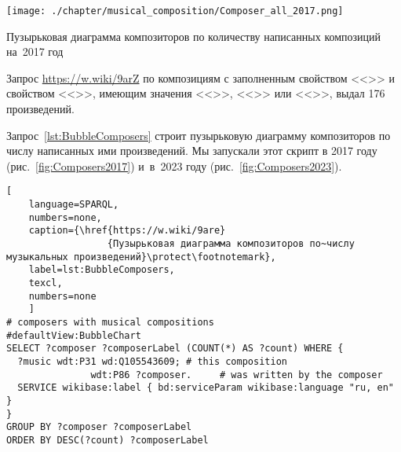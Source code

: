 \begin{marginfigure}[1\baselineskip]
  \texttt{[image: ./chapter/musical\_composition/Composer\_all\_2017.png]}
  \vspace{-7pt}
  \caption[Пузырьковая диаграмма композиторов по количеству написанных композиций на~2017 год]{Пузырьковая диаграмма композиторов по количеству написанных композиций на~2017 год}%
  \label{fig:Composers2017}%
\end{marginfigure}

Запрос \href{https://w.wiki/9arZ}{https://w.wiki/9arZ} по композициям с заполненным свойством <<>> и свойством <<>>, имеющим значения <<>>, <<>> или <<>>, выдал \num{176} произведений.


Запрос~\ref{lst:BubbleComposers} строит пузырьковую диаграмму композиторов по числу написанных ими произведений.
Мы запускали этот скрипт в 2017 году (рис.~\ref{fig:Composers2017}) 
и~в~2023 году (рис.~\ref{fig:Composers2023}).


\begin{lstlisting}[ 
    language=SPARQL, 
    numbers=none,
    caption={\href{https://w.wiki/9are}
                  {Пузырьковая диаграмма композиторов по~числу музыкальных произведений}\protect\footnotemark},
    label=lst:BubbleComposers,
    texcl,
    numbers=none
    ]
# composers with musical compositions
#defaultView:BubbleChart
SELECT ?composer ?composerLabel (COUNT(*) AS ?count) WHERE {
  ?music wdt:P31 wd:Q105543609; # this composition
               wdt:P86 ?composer.     # was written by the composer
  SERVICE wikibase:label { bd:serviceParam wikibase:language "ru, en" }
}
GROUP BY ?composer ?composerLabel
ORDER BY DESC(?count) ?composerLabel
\end{lstlisting}%

